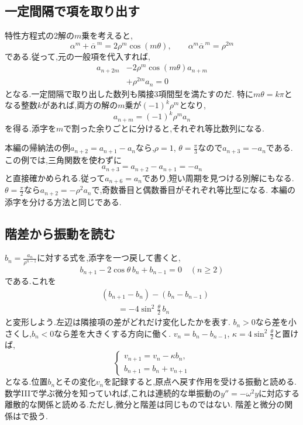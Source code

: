 \subsection{一定間隔で項を取り出す}\label{節：一定間隔で項を取り出す}
特性方程式の2解の$m$乗を考えると,
\[
  \alpha^m+\overline\alpha^{\,m}=2\rho^m\cos(m\theta),
  \qquad \alpha^m\overline\alpha^{\,m}=\rho^{2m}
\]
である.従って,元の一般項を代入すれば,
\[
  \begin{aligned}
    a_{n+2m}&-2\rho^m\cos(m\theta)a_{n+m}\\
             &+\rho^{2m}a_n=0
  \end{aligned}
\]
となる.一定間隔で取り出した数列も隣接3項間型を満たすのだ.
特に$m\theta=k\pi$となる整数$k$があれば,両方の解の$m$乗が$(-1)^k\rho^m$となり,
\[
  a_{n+m}=(-1)^k\rho^m a_n
\]
を得る.添字を$m$で割った余りごとに分けると,それぞれ等比数列になる.

本編の帰納法の例$a_{n+2}=a_{n+1}-a_n$なら,$\rho=1$, $\theta=\frac{\pi}{3}$なので$a_{n+3}=-a_n$である.
この例では,三角関数を使わずに
\[
  a_{n+3}=a_{n+2}-a_{n+1}=-a_n
\]
と直接確かめられる.従って$a_{n+6}=a_n$であり,短い周期を見つける別解にもなる.
$\theta=\frac{\pi}{2}$なら$a_{n+2}=-\rho^2a_n$で,奇数番目と偶数番目がそれぞれ等比型になる.
本編の添字を分ける方法と同じである.

\subsection{階差から振動を読む}\label{節：階差から振動を読む}
$b_n=\frac{a_n}{\rho^{n-1}}$に対する式を,添字を一つ戻して書くと,
\[
  b_{n+1}-2\cos\theta\,b_n+b_{n-1}=0\quad(n\ge2)
\]
である.これを
\[
  \begin{aligned}
    &(b_{n+1}-b_n)-(b_n-b_{n-1})\\
    &\qquad=-4\sin^2\frac{\theta}{2}\,b_n
  \end{aligned}
\]
と変形しよう.左辺は隣接項の差がどれだけ変化したかを表す.
$b_n>0$なら差を小さくし,$b_n<0$なら差を大きくする方向に働く.
$v_n=b_n-b_{n-1}$, $\kappa=4\sin^2\frac{\theta}{2}$と置けば,
\[
  \begin{cases}
    v_{n+1}=v_n-\kappa b_n,\\
    b_{n+1}=b_n+v_{n+1}
  \end{cases}
\]
となる.位置$b_n$とその変化$v_n$を記録すると,原点へ戻す作用を受ける振動と読める.
数学IIIで学ぶ微分を知っていれば,これは連続的な単振動の$y''=-\omega^2y$に対応する離散的な関係と読める.ただし,微分と階差は同じものではない.
階差と微分の関係はで扱う.

